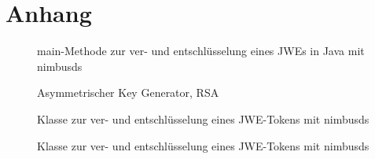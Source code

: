 \chapter{Anhang}
\begin{figure}[h]
    \scalebox{.6} {
        
    }
    \caption{main-Methode zur ver- und entschlüsselung eines JWEs in Java mit nimbusds}\label{fig: main}
\end{figure}

\begin{figure}
    \scalebox{.6} {
        
    }
    \caption{Asymmetrischer Key Generator, RSA}\label{fig: keyGenerator}
\end{figure}

\begin{figure}
    \scalebox{.6} {
        
        }
    \caption{Klasse zur ver- und entschlüsselung eines JWE-Tokens mit
    nimbusds}\label{fig: jweDecrypt}
\end{figure}
\begin{figure}[t]
    \scalebox{.6} {
        
        }
    \caption{Klasse zur ver- und entschlüsselung eines JWE-Tokens mit
    nimbusds}\label{fig: jweEncrypt}
\end{figure}
